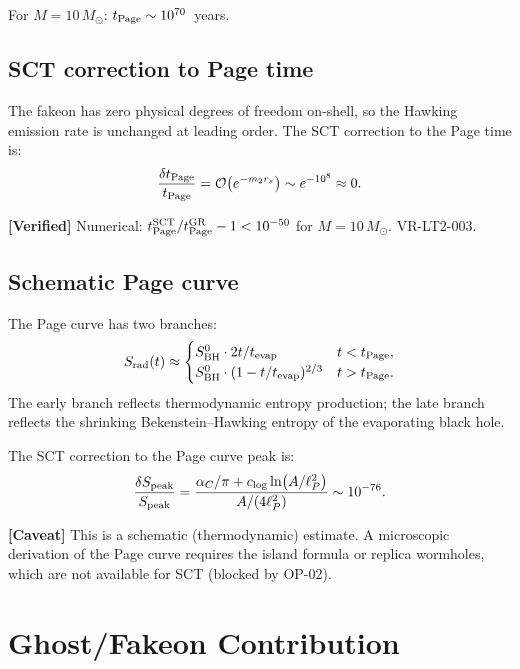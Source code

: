 \documentclass[11pt,a4paper]{article}
\renewcommand{\order}{\mathcal{O}}
\theoremstyle{plain}
\theoremstyle{definition}
\newcommand{\verified}[1]{%
  \par\smallskip\noindent
  \colorbox{green!10}{\parbox{\dimexpr\linewidth-2\fboxsep}{%
    \textcolor{green!50!black}{\textbf{[Verified]}} #1}}%
  \par\smallskip}
\newcommand{\caveat}[1]{%
  \par\smallskip\noindent
  \colorbox{yellow!15}{\parbox{\dimexpr\linewidth-2\fboxsep}{%
    \textcolor{orange!70!black}{\textbf{[Caveat]}} #1}}%
  \par\smallskip}
\begin{document}
For $M = 10\,M_\odot$: $t_{\rm Page} \sim 10^{70}$~years.

\subsection{SCT correction to Page time}

The fakeon has zero physical degrees of freedom on-shell, so the
Hawking emission rate is unchanged at leading order.  The SCT
correction to the Page time is:
\begin{equation}
\frac{\delta t_{\rm Page}}{t_{\rm Page}}
  = \order\!\left(e^{-m_2 r_s}\right)
  \sim e^{-10^8} \approx 0.
\end{equation}

\verified{Numerical: $t_{\rm Page}^{\rm SCT}/t_{\rm Page}^{\rm GR} - 1
  < 10^{-50}$ for $M = 10\,M_\odot$.  VR-LT2-003.}

\subsection{Schematic Page curve}

The Page curve has two branches:
\begin{equation}
S_{\rm rad}(t) \approx
\begin{cases}
S_{\rm BH}^0 \cdot 2t/t_{\rm evap} & t < t_{\rm Page}, \\
S_{\rm BH}^0 \cdot (1 - t/t_{\rm evap})^{2/3} & t > t_{\rm Page}.
\end{cases}
\end{equation}
The early branch reflects thermodynamic entropy production; the late
branch reflects the shrinking Bekenstein--Hawking entropy of the
evaporating black hole.

The SCT correction to the Page curve peak is:
\begin{equation}
\frac{\delta S_{\rm peak}}{S_{\rm peak}}
  = \frac{\alpha_C/\pi + c_{\log}\ln(A/\ell_P^2)}{A/(4\ell_P^2)}
  \sim 10^{-76}.
\end{equation}

\caveat{This is a schematic (thermodynamic) estimate.  A microscopic
  derivation of the Page curve requires the island formula or replica
  wormholes, which are not available for SCT (blocked by OP-02).}


\section{Ghost/Fakeon Contribution}
\label{sec:ghost}
\end{document}
